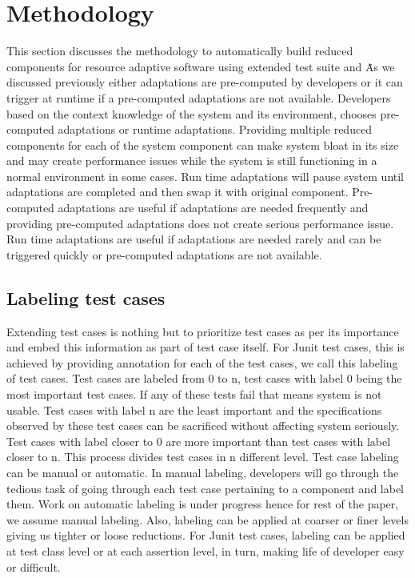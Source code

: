 \section{Methodology}

This section discusses the methodology to automatically build reduced components for resource adaptive software using extended test suite and \mytool\. As we discussed previously either adaptations are pre-computed by developers or it can trigger at runtime if a pre-computed adaptations are not available.
Developers based on the context knowledge of the system and its environment, chooses pre-computed adaptations or runtime adaptations. Providing multiple reduced components for each of the system component can make system bloat in its size and may create performance issues while the system is still functioning in a normal environment in some cases. Run time adaptations will pause system until adaptations are completed and then swap it with original component. Pre-computed adaptations are useful if adaptations are needed frequently and providing pre-computed adaptations does not create serious performance issue. Run time adaptations are useful if adaptations are needed rarely and can be triggered quickly or pre-computed adaptations are not available.   

\subsection{Labeling test cases}

Extending test cases is nothing but to prioritize test cases as per its importance and embed this information as part of test case itself. For Junit test cases, this is achieved by providing annotation for each of the test cases, we call this labeling of test cases. Test cases are labeled from 0 to n, test cases with label 0 being the most important test cases. If any of these tests fail that means system is not usable. Test cases with label n are the least important and the specifications observed by these test cases can be sacrificed without affecting system seriously. Test cases with label closer to 0 are more important than test cases with label closer to n. This process divides test cases in n different level. Test case labeling can be manual or automatic. In manual labeling, developers will go through the tedious task of going through each test case pertaining to a component and label them. Work on automatic labeling is under progress hence for rest of the paper, we assume manual labeling. Also, labeling can be applied at coarser or finer levels giving us tighter or loose reductions. For Junit test cases, labeling can be applied at test class level or at each assertion level, in turn, making life of developer easy or difficult. 


